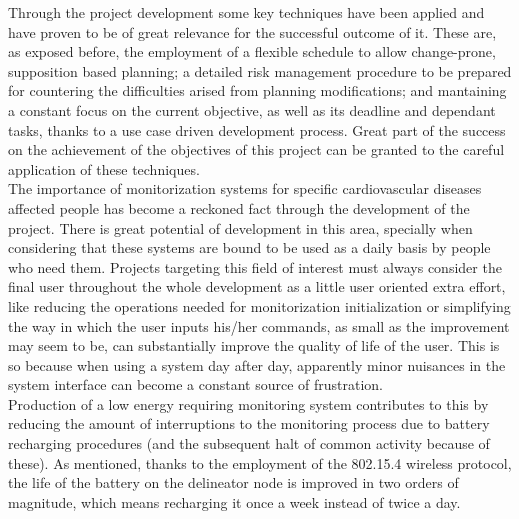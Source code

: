 		Through the project development some key techniques have been applied and have proven to be of great relevance for the successful outcome of it. These are, as exposed before, the employment of a flexible schedule to allow change-prone, supposition based planning; a detailed risk management procedure to be prepared for countering the difficulties arised from planning modifications; and mantaining a constant focus on the current objective, as well as its deadline and dependant tasks, thanks to a use case driven development process. Great part of the success on the achievement of the objectives of this project can be granted to the careful application of these techniques.\\

		The importance of monitorization systems for specific cardiovascular diseases affected people has become a reckoned fact through the development of the project. There is great potential of development in this area, specially when considering that these systems are bound to be used as a daily basis by people who need them. Projects targeting this field of interest must always consider the final user throughout the whole development as a little user oriented extra effort, like reducing the operations needed for monitorization initialization or simplifying the way in which the user inputs his/her commands, as small as the improvement may seem to be, can substantially improve the quality of life of the user. This is so because when using a system day after day, apparently minor nuisances in the system interface can become a constant source of frustration.\\

		Production of a low energy requiring monitoring system contributes to this by reducing the amount of interruptions to the monitoring process due to battery recharging procedures (and the subsequent halt of common activity because of these). As mentioned, thanks to the employment of the 802.15.4 wireless protocol, the life of the battery on the delineator node is improved in two orders of magnitude, which means recharging it once a week instead of twice a day.\\

